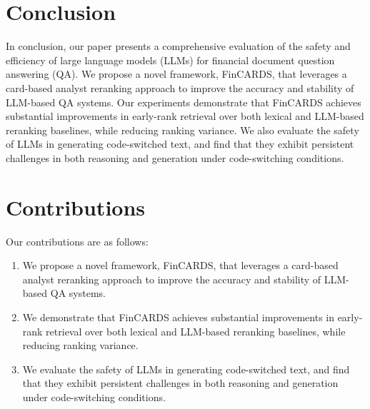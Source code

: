 \documentclass{article}
\begin{document}
\section{Conclusion}
In conclusion, our paper presents a comprehensive evaluation of the safety and efficiency of large language models (LLMs) for financial document question answering (QA). We propose a novel framework, FinCARDS, that leverages a card-based analyst reranking approach to improve the accuracy and stability of LLM-based QA systems. Our experiments demonstrate that FinCARDS achieves substantial improvements in early-rank retrieval over both lexical and LLM-based reranking baselines, while reducing ranking variance. We also evaluate the safety of LLMs in generating code-switched text, and find that they exhibit persistent challenges in both reasoning and generation under code-switching conditions.

\section{Contributions}
Our contributions are as follows:

\begin{enumerate}
\item We propose a novel framework, FinCARDS, that leverages a card-based analyst reranking approach to improve the accuracy and stability of LLM-based QA systems.
\item We demonstrate that FinCARDS achieves substantial improvements in early-rank retrieval over both lexical and LLM-based reranking baselines, while reducing ranking variance.
\item We evaluate the safety of LLMs in generating code-switched text, and find that they exhibit persistent challenges in both reasoning and generation under code-switching conditions.
\end{enumerate}



\end{document}
